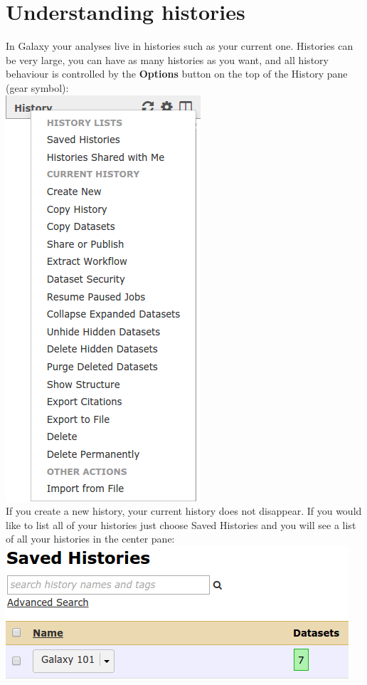\documentclass[11pt,a4paper]{article}
\begin{document}
\section{Understanding histories}
In Galaxy your analyses live in histories such as your current one. Histories can be very large, you can have as many histories as you want, and all history behaviour is controlled by the \textbf{Options} button on the top of the History pane (gear symbol):\\
\includegraphics[scale=0.65]{figures/101_22}\\
If you create a new history, your current history does not disappear. If you would like to list all of your histories just choose Saved Histories and you will see a list of all your histories in the center pane:\\
\includegraphics[scale=0.65]{figures/101_23}\\
\end{document}

